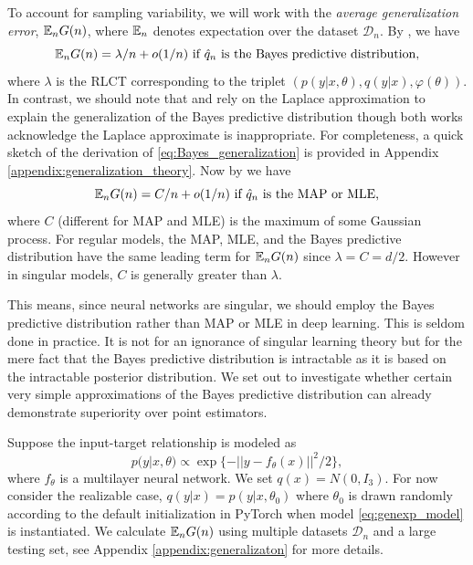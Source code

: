 \documentclass{article} %
\begin{document}
To account for sampling variability, we will work with the \textit{average generalization error}, ${\mathbb{E}}_n G(n)$, where ${\mathbb{E}}_n$ denotes expectation over the dataset $\mathcal D_n$.
By {\citet[Theorem 1.2 and Theorem 7.2]{watanabe_algebraic_2009}}, we have
\begin{equation}
{\mathbb{E}}_n G(n) = \lambda/n + o(1/n)  \text{ if $\hat q_n$ is the Bayes predictive distribution,}
\label{eq:Bayes_generalization}
\end{equation}
where $\lambda$ is the RLCT corresponding to the triplet $( p(y|x,\theta), q(y|x), \varphi(\theta) )$. In contrast, we should note that \citet{zhang_energyentropy_2018} and  \citet{le_bayesian_2018} rely on the Laplace approximation to explain the generalization of the Bayes predictive distribution though both works acknowledge the Laplace approximate is inappropriate. For completeness, a quick sketch of the derivation of \eqref{eq:Bayes_generalization} is provided in Appendix \ref{appendix:generalization_theory}.
Now by {\cite[Theorem 6.4]{watanabe_algebraic_2009}} we have
\begin{equation}
{\mathbb{E}}_n G(n) = C/n + o(1/n)   \text{ if $\hat q_n$ is the MAP or MLE,}
\label{eq:map_generalization}
\end{equation}
where $C$ (different for MAP and MLE) is the maximum of some Gaussian process. For regular models, the MAP, MLE, and the Bayes predictive distribution have the same leading term for ${\mathbb{E}}_n G(n)$ since $\lambda = C = d/2$. However in singular models, $C$ is generally greater than $\lambda$. 

This means, since neural networks are singular, we should employ the Bayes predictive distribution rather than MAP or MLE in deep learning. This is seldom done in practice. It is not for an ignorance of singular learning theory but for the mere fact that the Bayes predictive distribution is intractable as it is based on the intractable posterior distribution. 
We set out to investigate whether certain very simple approximations of the Bayes predictive distribution can already demonstrate superiority over point estimators. 

Suppose the input-target relationship is modeled as
\begin{equation}
p(y|x,\theta) \propto \exp\{-|| y - f_\theta(x) ||^2/2\},
\label{eq:genexp_model}
\end{equation}
where $f_\theta$ is a multilayer neural network.
We set $q(x) = N(0,I_3)$. 
For now consider the realizable case, $q(y|x) = p(y|x,\theta_0)$ where $\theta_0$ is drawn randomly according to the default initialization in PyTorch when model \ref{eq:genexp_model} is instantiated. We calculate $\mathbb{E}_n G(n)$ using multiple datasets $\mathcal D_n$ and a large testing set, see Appendix \ref{appendix:generalizaton} for more details. 
\end{document}
